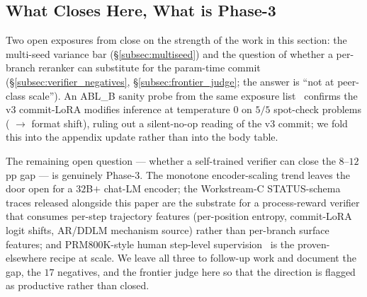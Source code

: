 \subsection{What Closes Here, What is Phase-3}
\label{subsec:voting_gap_takeaway}

Two open exposures from  close on the strength of
the work in this section: the multi-seed variance bar
(\S\ref{subsec:multiseed}) and the question of whether a per-branch
reranker can substitute for the param-time commit
(\S\ref{subsec:verifier_negatives}, \S\ref{subsec:frontier_judge};
the answer is ``not at peer-class scale'').  An ABL\_B sanity probe
from the same exposure list~\citep{abl_b_result} confirms the v3
commit-LoRA modifies inference at temperature $0$ on $5/5$ spot-check
problems ( $\to$  format shift),
ruling out a silent-no-op reading of the v3 commit; we fold this
into the appendix update rather than into the body table.

The remaining open question --- whether a self-trained verifier can
close the $8\text{--}12$\,pp gap --- is genuinely Phase-3.  The
monotone encoder-scaling trend leaves the door open for a $32$B$+$
chat-LM encoder; the Workstream-C STATUS-schema traces released
alongside this paper are the substrate for a process-reward
verifier that consumes per-step trajectory features (per-position
entropy, commit-LoRA logit shifts, AR/DDLM mechanism source) rather
than per-branch surface features; and PRM800K-style human
step-level supervision~\citep{lightman2023letsverify} is the
proven-elsewhere recipe at scale.  We leave all three to follow-up
work and document the gap, the $17$ negatives, and the frontier
judge here so that the direction is flagged as productive rather
than closed.
